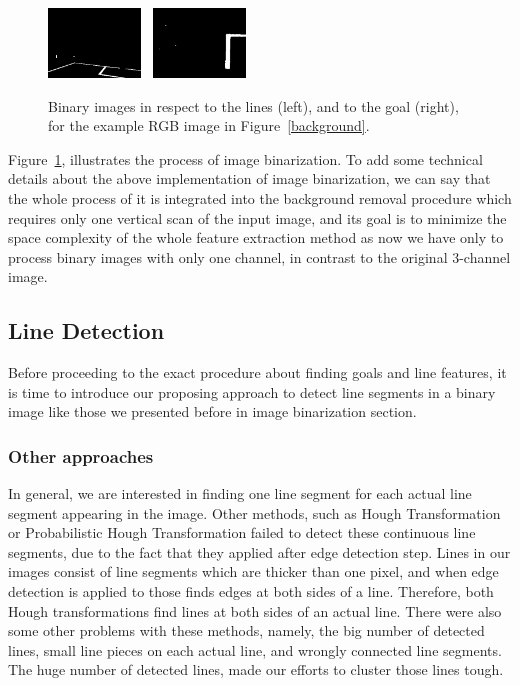 \documentclass[	DIV=calc,%
							paper=a4,%
							fontsize=9pt,%
							twocolumn]{scrartcl}	 					%
\begin{document}
\begin{figure}[h!]
\caption{Binary images in respect to the lines (left),  and to the goal (right), for the example RGB image in Figure~\ref{background}.}
\label{binary}
\centering    
\includegraphics[width=0.22\textwidth]{figures/bin_lines.png} \	
\includegraphics[width=0.22\textwidth]{figures/bin_posts.png} \	
\end{figure}

Figure~\ref{binary}, illustrates the process of image binarization. To add some technical details about the above implementation of image binarization, we can say that the whole process of it is integrated into the background removal procedure which requires only one vertical scan of the input image, and its goal is to minimize the space complexity of the whole feature extraction method as now we have only to process binary images with only one channel, in contrast to the original 3-channel image.

\subsection{Line Detection}
Before proceeding to the exact procedure about finding goals and line features, it is time to introduce our proposing approach to detect line segments in a binary image like those we presented before in image binarization section.

\subsubsection{Other approaches}
In general, we are interested in finding one line segment for each actual line segment appearing in the image. Other methods, such as Hough Transformation or Probabilistic Hough Transformation failed to detect these continuous line segments, due to the fact that they applied after edge detection step. Lines in our images consist of line segments which are thicker than one pixel, and when edge detection is applied to those finds edges at both sides of a line. Therefore, both Hough transformations find lines at both sides of an actual line. There were also some other problems with these methods, namely, the big number of detected lines, small line pieces on each actual line, and wrongly connected line segments. The huge number of detected lines, made our efforts to cluster those lines tough.
\end{document}
